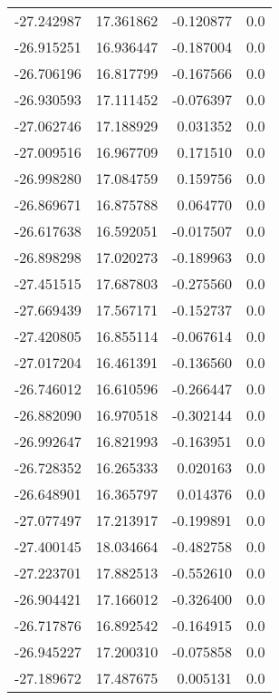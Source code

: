 \begin{tabular}{rrrr}
      -27.242987 &        17.361862 &   -0.120877 &   0.0 \\
      -26.915251 &        16.936447 &   -0.187004 &   0.0 \\
      -26.706196 &        16.817799 &   -0.167566 &   0.0 \\
      -26.930593 &        17.111452 &   -0.076397 &   0.0 \\
      -27.062746 &        17.188929 &    0.031352 &   0.0 \\
      -27.009516 &        16.967709 &    0.171510 &   0.0 \\
      -26.998280 &        17.084759 &    0.159756 &   0.0 \\
      -26.869671 &        16.875788 &    0.064770 &   0.0 \\
      -26.617638 &        16.592051 &   -0.017507 &   0.0 \\
      -26.898298 &        17.020273 &   -0.189963 &   0.0 \\
      -27.451515 &        17.687803 &   -0.275560 &   0.0 \\
      -27.669439 &        17.567171 &   -0.152737 &   0.0 \\
      -27.420805 &        16.855114 &   -0.067614 &   0.0 \\
      -27.017204 &        16.461391 &   -0.136560 &   0.0 \\
      -26.746012 &        16.610596 &   -0.266447 &   0.0 \\
      -26.882090 &        16.970518 &   -0.302144 &   0.0 \\
      -26.992647 &        16.821993 &   -0.163951 &   0.0 \\
      -26.728352 &        16.265333 &    0.020163 &   0.0 \\
      -26.648901 &        16.365797 &    0.014376 &   0.0 \\
      -27.077497 &        17.213917 &   -0.199891 &   0.0 \\
      -27.400145 &        18.034664 &   -0.482758 &   0.0 \\
      -27.223701 &        17.882513 &   -0.552610 &   0.0 \\
      -26.904421 &        17.166012 &   -0.326400 &   0.0 \\
      -26.717876 &        16.892542 &   -0.164915 &   0.0 \\
      -26.945227 &        17.200310 &   -0.075858 &   0.0 \\
      -27.189672 &        17.487675 &    0.005131 &   0.0 \\

\end{tabular}
